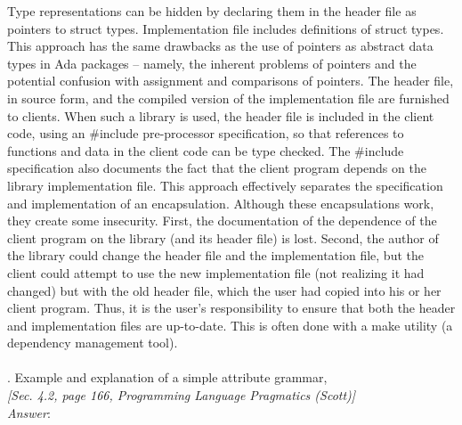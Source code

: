 \documentclass[a4paper,12pt]{article}
\begin{document}
Type representations can be hidden by declaring them in the header file as pointers to struct types. Implementation file includes definitions of struct types. This approach has the same drawbacks as the use of pointers as abstract data types in Ada packages -- namely, the inherent problems of pointers and the potential confusion with assignment and comparisons of pointers. The header file, in source form, and the compiled version of the implementation file are furnished to clients. When such a library is used, the header file is included in the client code, using an \#include pre-processor specification, so that references to functions and data in the client code can be type checked. The \#include specification also documents the fact that the client program depends on the library implementation file. This approach effectively separates the specification and implementation of an encapsulation. Although these encapsulations work, they create some insecurity. First, the documentation of the dependence of the client program on the library (and its header file) is lost. Second, the author of the library could change the header file and the implementation file, but the client could attempt to use the new implementation file (not realizing it had changed) but with the old header file, which the user had copied into his or her client program. Thus, it is the user's responsibility to ensure that both the header and implementation files are up-to-date. This is often done with a make utility (a dependency management tool).\\
\\
. Example and explanation of a simple attribute grammar,\\ \textit{[Sec. 4.2, page 166, Programming Language Pragmatics (Scott)]}\\
\emph{Answer}:
\end{document}
